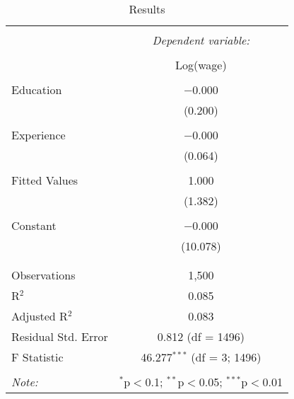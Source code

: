 
\begin{table}[!htbp] \centering 
  \caption{Results} 
  \label{tab:question-5-b} 
\begin{tabular}{@{\extracolsep{5pt}}lc} 
\\[-1.8ex]\hline 
\hline \\[-1.8ex] 
 & \multicolumn{1}{c}{\textit{Dependent variable:}} \\ 
\cline{2-2} 
\\[-1.8ex] & Log(wage) \\ 
\hline \\[-1.8ex] 
 Education & $-$0.000 \\ 
  & (0.200) \\ 
  & \\ 
 Experience & $-$0.000 \\ 
  & (0.064) \\ 
  & \\ 
 Fitted Values & 1.000 \\ 
  & (1.382) \\ 
  & \\ 
 Constant & $-$0.000 \\ 
  & (10.078) \\ 
  & \\ 
\hline \\[-1.8ex] 
Observations & 1,500 \\ 
R$^{2}$ & 0.085 \\ 
Adjusted R$^{2}$ & 0.083 \\ 
Residual Std. Error & 0.812 (df = 1496) \\ 
F Statistic & 46.277$^{***}$ (df = 3; 1496) \\ 
\hline 
\hline \\[-1.8ex] 
\textit{Note:}  & \multicolumn{1}{r}{$^{*}$p$<$0.1; $^{**}$p$<$0.05; $^{***}$p$<$0.01} \\ 
\end{tabular} 
\end{table} 
